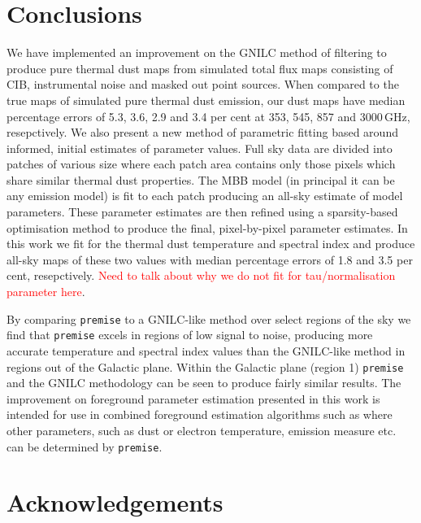\documentclass[a4paper,fleqn,usenatbib]{mnras}
\begin{document}
\section{Conclusions}
We have implemented an improvement on the GNILC method of filtering to produce pure thermal dust maps from simulated total flux maps consisting of CIB, instrumental noise and masked out point sources. When compared to the true maps of simulated pure thermal dust emission, our dust maps have median percentage errors of 5.3, 3.6, 2.9 and 3.4 per cent at 353, 545, 857 and 3000\,GHz, resepctively. We also present a new method of parametric fitting based around informed, initial estimates of parameter values. Full sky data are divided into patches of various size where each patch area contains only those pixels which share similar thermal dust properties. The MBB model (in principal it can be any emission model) is fit to each patch producing an all-sky estimate of model parameters. These parameter estimates are then refined using a sparsity-based optimisation method to produce the final, pixel-by-pixel parameter estimates. In this work we fit for the thermal dust temperature and spectral index and produce all-sky maps of these two values with median percentage errors of 1.8 and 3.5 per cent, resepctively. \textcolor{red}{Need to talk about why we do not fit for tau/normalisation parameter here}. 

By comparing {\texttt{premise}} to a GNILC-like method over select regions of the sky we find that {\texttt{premise}} excels in regions of low signal to noise, producing more accurate temperature and spectral index values than the GNILC-like method in regions out of the Galactic plane. Within the Galactic plane (region 1) {\texttt{premise}} and the GNILC methodology can be seen to produce fairly similar results. The improvement on foreground parameter estimation presented in this work is intended for use in combined foreground estimation algorithms such as \citet{gmca} where other parameters, such as dust or electron temperature, emission measure etc. can be determined by {\texttt{premise}}.
\section*{Acknowledgements}




\end{document}
